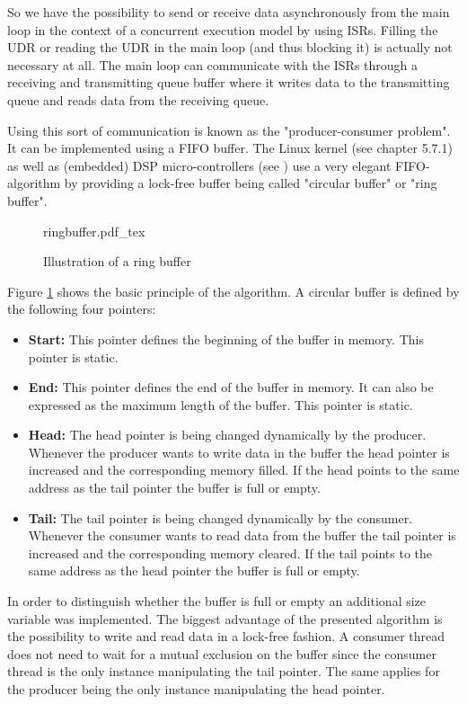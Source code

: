 So we have the possibility to send or receive data asynchronously from the main loop in the context of a concurrent execution model by using ISRs. Filling the UDR or reading the UDR in the main loop (and thus blocking it) is actually not necessary at all. The main loop can communicate with the ISRs through a receiving and transmitting queue buffer where it writes data to the transmitting queue and reads data from the receiving queue.

Using this sort of communication is known as the "producer-consumer problem". It can be implemented using a FIFO buffer. The Linux kernel (see \cite{linux_device_drivers} chapter 5.7.1) as well as (embedded) DSP micro-controllers (see \cite{ti_dsp}) use a very elegant FIFO-algorithm by providing a lock-free buffer being called "circular buffer" or "ring buffer".

\begin{figure}[H]
\centering
{ringbuffer.pdf_tex}
\caption{Illustration of a ring buffer}
\label{fig:ringbuffer}
\end{figure}

Figure \ref{fig:ringbuffer} shows the basic principle of the algorithm. A circular buffer is defined by the following four pointers:

\begin{itemize}
\item \textbf{Start:} This pointer defines the beginning of the buffer in memory. This pointer is static.
\item \textbf{End:} This pointer defines the end of the buffer in memory. It can also be expressed as the maximum length of the buffer. This pointer is static.
\item \textbf{Head:} The head pointer is being changed dynamically by the producer. Whenever the producer wants to write data in the buffer the head pointer is increased and the corresponding memory filled. If the head points to the same address as the tail pointer the buffer is full or empty.
\item \textbf{Tail:} The tail pointer is being changed dynamically by the consumer. Whenever the consumer wants to read data from the buffer the tail pointer is increased and the corresponding memory cleared. If the tail points to the same address as the head pointer the buffer is full or empty.
\end{itemize}

In order to distinguish whether the buffer is full or empty an additional size variable was implemented. The biggest advantage of the presented algorithm is the possibility to write and read data in a lock-free fashion. A consumer thread does not need to wait for a mutual exclusion on the buffer since the consumer thread is the only instance manipulating the tail pointer. The same applies for the producer being the only instance manipulating the head pointer.

